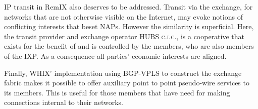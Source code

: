 
IP transit in RemIX also deserves to be addressed. Transit
via the exchange, for networks that are not otherwise visible on the Internet,
may evoke notions of conflicting interests that
beset \acp{NAP}. However the similarity is superficial. Here, the transit
provider and exchange operator HUBS \textsc{c.i.c.}, is a cooperative
that exists for the benefit of and is controlled by the members, who
are also members of the \ac{IXP}. As a consequence all parties'
economic interests are aligned.

Finally, \ac{WHIX}' implementation using \acs{BGP}-\acs{VPLS}
to construct the exchange fabric makes it possible to offer auxiliary
point to point pseudo-wire services to its members. This is
useful for those members that have need for making connections internal to their
networks.
